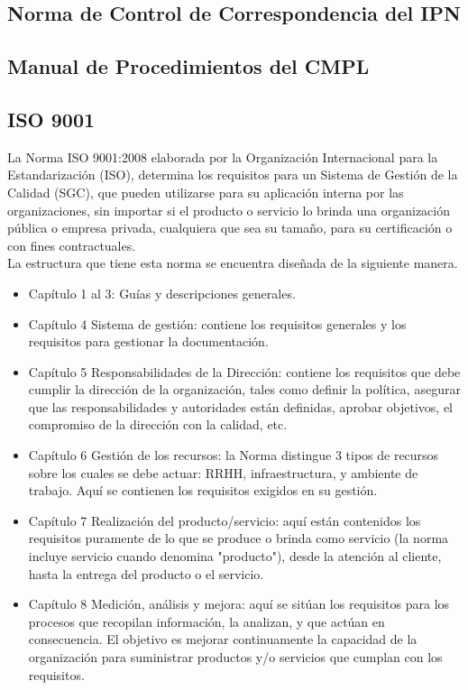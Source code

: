 	\subsection{Norma de Control de Correspondencia del IPN}
	
	\subsection{Manual de Procedimientos del CMPL}
	
	\subsection{ISO 9001}
	La Norma ISO 9001:2008 elaborada por la Organización Internacional para la Estandarización (ISO), determina los requisitos para un Sistema de Gestión de la Calidad (SGC), que pueden utilizarse para su aplicación interna por las organizaciones, sin importar si el producto o servicio lo brinda una organización pública o empresa privada, cualquiera que sea su tamaño, para su certificación o con fines contractuales.\\
	
	La estructura que tiene esta norma se encuentra diseñada de la siguiente manera.\\
	
	\begin{itemize}
		\item Capítulo 1 al 3: Guías y descripciones generales.
		\item Capítulo 4 Sistema de gestión: contiene los requisitos generales y los requisitos para gestionar la documentación.
		\item Capítulo 5 Responsabilidades de la Dirección: contiene los requisitos que debe cumplir la dirección de la organización, tales como definir la política, asegurar que las responsabilidades y autoridades están definidas, aprobar objetivos, el compromiso de la dirección con la calidad, etc.
		\item Capítulo 6 Gestión de los recursos: la Norma distingue 3 tipos de recursos sobre los cuales se debe actuar: RRHH, infraestructura, y ambiente de trabajo. Aquí se contienen los requisitos exigidos en su gestión.
		\item Capítulo 7 Realización del producto/servicio: aquí están contenidos los requisitos puramente de lo que se produce o brinda como servicio (la norma incluye servicio cuando denomina "producto"), desde la atención al cliente, hasta la entrega del producto o el servicio.
		\item Capítulo 8 Medición, análisis y mejora: aquí se sitúan los requisitos para los procesos que recopilan información, la analizan, y que actúan en consecuencia. El objetivo es mejorar continuamente la capacidad de la organización para suministrar productos y/o servicios que cumplan con los requisitos.
	\end{itemize}
	
